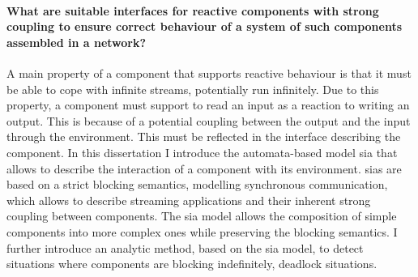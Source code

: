 \paragraph*{What are suitable interfaces for reactive components with strong coupling to ensure correct behaviour of a system of such components assembled in a network?} \hfill

A main property of a component that supports reactive behaviour is that it must be able to cope with infinite streams, \ie potentially run infinitely.
Due to this property, a component must support to read an input as a reaction to writing an output.
This is because of a potential coupling between the output and the input through the environment.
This must be reflected in the interface describing the component.
In this dissertation I introduce the automata-based model \gls{sia} that allows to describe the interaction of a component with its environment.
\Glspl{sia} are based on a strict blocking semantics, modelling synchronous communication, which allows to describe streaming applications and their inherent strong coupling between components.
The \gls{sia} model allows the composition of simple components into more complex ones while preserving the blocking semantics.
I further introduce an analytic method, based on the \gls{sia} model, to detect situations where components are blocking indefinitely, \eg deadlock situations.




